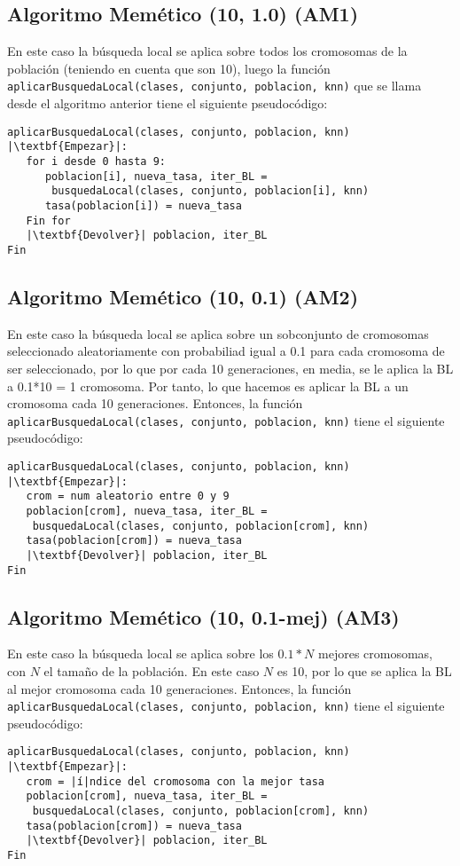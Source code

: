 \documentclass[12pt]{article}
\begin{document}
\subsection{Algoritmo Memético (10, 1.0) (AM1)}
En este caso la búsqueda local se aplica sobre todos los cromosomas de la población (teniendo en cuenta que son 10), luego la función \texttt{aplicarBusquedaLocal(clases, conjunto, poblacion, knn)} que se llama desde el algoritmo anterior tiene el siguiente pseudocódigo:
\begin{lstlisting}
aplicarBusquedaLocal(clases, conjunto, poblacion, knn) |\textbf{Empezar}|:
   for i desde 0 hasta 9:
      poblacion[i], nueva_tasa, iter_BL =
       busquedaLocal(clases, conjunto, poblacion[i], knn)
      tasa(poblacion[i]) = nueva_tasa
   Fin for
   |\textbf{Devolver}| poblacion, iter_BL
Fin
\end{lstlisting}

\subsection{Algoritmo Memético (10, 0.1) (AM2)}
En este caso la búsqueda local se aplica sobre un sobconjunto de cromosomas seleccionado aleatoriamente con probabiliad igual a 0.1 para cada cromosoma de ser seleccionado, por lo que por cada 10 generaciones, en media, se le aplica la BL a 0.1*10 = 1 cromosoma. Por tanto, lo que hacemos es aplicar la BL a un cromosoma cada 10 generaciones. Entonces, la función \texttt{aplicarBusquedaLocal(clases, conjunto, poblacion, knn)} tiene el siguiente pseudocódigo:
\begin{lstlisting}
aplicarBusquedaLocal(clases, conjunto, poblacion, knn) |\textbf{Empezar}|:
   crom = num aleatorio entre 0 y 9
   poblacion[crom], nueva_tasa, iter_BL =
    busquedaLocal(clases, conjunto, poblacion[crom], knn)
   tasa(poblacion[crom]) = nueva_tasa
   |\textbf{Devolver}| poblacion, iter_BL
Fin
\end{lstlisting}

\subsection{Algoritmo Memético (10, 0.1-mej) (AM3)}
En este caso la búsqueda local se aplica sobre los $0.1*N$ mejores cromosomas, con $N$ el tamaño de la población. En este caso $N$ es 10, por lo que se aplica la BL al mejor cromosoma cada 10 generaciones. Entonces, la función \texttt{aplicarBusquedaLocal(clases, conjunto, poblacion, knn)} tiene el siguiente pseudocódigo:
\begin{lstlisting}
aplicarBusquedaLocal(clases, conjunto, poblacion, knn) |\textbf{Empezar}|:
   crom = |í|ndice del cromosoma con la mejor tasa
   poblacion[crom], nueva_tasa, iter_BL =
    busquedaLocal(clases, conjunto, poblacion[crom], knn)
   tasa(poblacion[crom]) = nueva_tasa
   |\textbf{Devolver}| poblacion, iter_BL
Fin
\end{lstlisting}
\end{document}
